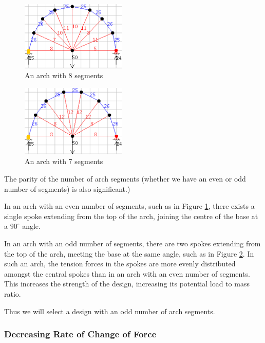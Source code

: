 \documentclass[a4paper,11pt]{article}
\begin{document}
\begin{figure}
\begin{center}
\includegraphics[width=5cm]{figures/arch-1.png}
\end{center}
\caption{An arch with 8 segments}
\label{arch:8-segments}
\end{figure}

\begin{figure}
\begin{center}
\includegraphics[width=5cm]{figures/arch-2.png}
\end{center}
\caption{An arch with 7 segments}
\label{arch:7-segments}
\end{figure}

The parity of the number of arch segments (whether we have an even or odd number
of segments) is also significant.)

In an arch with an even number of segments, such as in Figure
\ref{arch:8-segments}, there exists a single spoke extending from the top of
the arch, joining the centre of the base at a $90^\circ$ angle.

In an arch with an odd number of segments, there are two spokes extending from
the top of the arch, meeting the base at the same angle, such as in Figure
\ref{arch:7-segments}.
In such an arch, the tension forces in the spokes are more evenly distributed
amongst the central spokes than in an arch with an even number of segments.
This increases the strength of the design, increasing its potential load to mass
ratio.

Thus we will select a design with an odd number of arch segments.


\subsubsection{Decreasing Rate of Change of Force}
\end{document}
